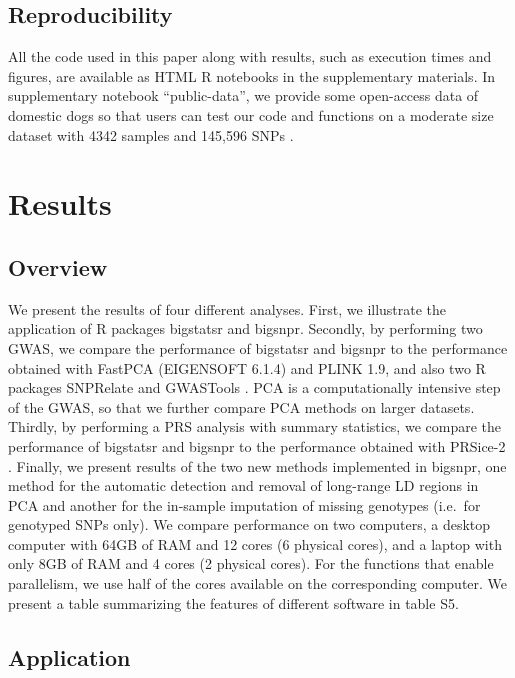 \documentclass{bioinfo}
\begin{document}
\begin{methods}
\subsection{Reproducibility}

All the code used in this paper along with results, such as execution times and figures, are available as HTML R notebooks in the supplementary materials. 
In supplementary notebook ``public-data'', we provide some open-access data of domestic dogs so that users can test our code and functions on a moderate size dataset with 4342 samples and 145,596 SNPs \cite[]{hayward2016complex}.

\end{methods}

\section{Results}

\subsection{Overview}\label{sec:overview}

We present the results of four different analyses. 
First, we illustrate the application of R packages bigstatsr and bigsnpr. 
Secondly, by performing two GWAS, we compare the performance of bigstatsr and bigsnpr to the performance obtained with FastPCA (EIGENSOFT 6.1.4) and PLINK 1.9, and also two R packages SNPRelate and GWASTools \cite[]{chang2015second,Galinsky2016,Gogarten2012,zheng2012high}. PCA is a computationally intensive step of the GWAS, so that we further compare PCA methods on larger datasets.
Thirdly, by performing a PRS analysis with summary statistics, we compare the performance of bigstatsr and bigsnpr to the performance obtained with PRSice-2 \cite[]{Euesden2015}. 
Finally, we present results of the two new methods implemented in bigsnpr, one method for the automatic detection and removal of long-range LD regions in PCA and another for the in-sample imputation of missing genotypes (i.e.\ for genotyped SNPs only). 
We compare performance on two computers, a desktop computer with 64GB of RAM and 12 cores (6 physical cores), and a laptop with only 8GB of RAM and 4 cores (2 physical cores). For the functions that enable parallelism, we use half of the cores available on the corresponding computer. We present a table summarizing the features of different software in table S5.

\subsection{Application}
 
\end{document}
